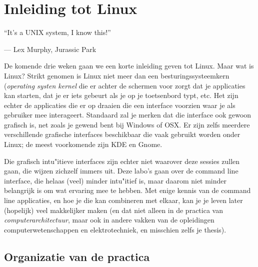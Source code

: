 \documentclass[a4paper]{memoir}
\begin{document}
\epigraphfontsize{\small\itshape}

\chapter{Inleiding tot Linux}
\epigraph{``It’s a UNIX system, I know this!''}{--- \textup{Lex Murphy}, Jurassic Park}

De komende drie weken gaan we een korte inleiding geven tot Linux. Maar wat is Linux? Strikt genomen is Linux
niet meer dan een besturingssysteemkern (\emph{operating systen kernel} die er achter de schermen voor zorgt dat je applicaties kan starten, dat je
er iets gebeurt als je op je toetsenbord typt, etc. Het zijn echter de applicaties die er op draaien die een interface voorzien waar je als gebruiker mee interageert.
Standaard zal je merken dat die interface ook gewoon grafisch is, net zoals je gewend bent bij Windows of OSX. Er zijn zelfs meerdere verschillende grafische interfaces
beschikbaar die vaak gebruikt worden onder Linux; de meest voorkomende zijn KDE en Gnome.

Die grafisch intu"itieve interfaces zijn echter niet waarover deze sessies zullen gaan, die wijzen zichzelf immers uit. Deze labo's gaan over
de command line interface, die helaas (veel) minder intu"itief is, maar daarom niet minder belangrijk is om wat ervaring mee te hebben. Met enige kennis van de command
line applicaties, en hoe je die kan combineren met elkaar, kan je je leven later (hopelijk) veel makkelijker maken (en dat niet alleen in de practica van \emph{computerarchitectuur},
maar ook in andere vakken van de opleidingen computerwetenschappen en elektrotechniek, en misschien zelfs je thesis).

\section{Organizatie van de practica}
\end{document}
